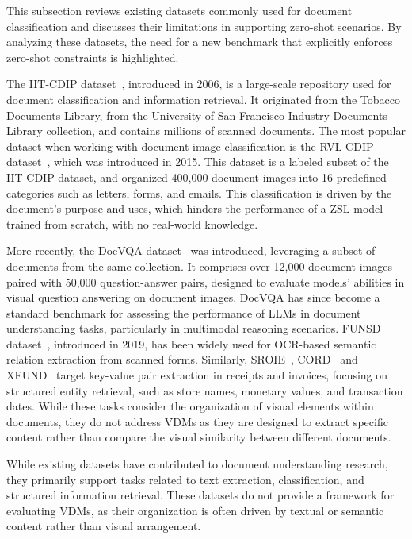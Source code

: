 This subsection reviews existing datasets commonly used for document classification and discusses their limitations in supporting zero-shot scenarios. By analyzing these datasets, the need for a new benchmark that explicitly enforces zero-shot constraints is highlighted.

The IIT-CDIP dataset~\cite{iitcdip2006}, introduced in 2006, is a large-scale repository used for document classification and information retrieval. It originated from the Tobacco Documents Library, from the University of San Francisco Industry Documents Library collection, and contains millions of scanned documents. The most popular dataset when working with document-image classification is the RVL-CDIP dataset~\cite{harley2015rvlcdip}, which was introduced in 2015. This dataset is a labeled subset of the IIT-CDIP dataset, and organized 400,000 document images into 16 predefined categories such as letters, forms, and emails. This classification is driven by the document's purpose and uses, which hinders the performance of a ZSL model trained from scratch, with no real-world knowledge.

More recently, the DocVQA dataset~\cite{mathew2021docvqa} was introduced, leveraging a subset of documents from the same collection. It comprises over 12,000 document images paired with 50,000 question-answer pairs, designed to evaluate models’ abilities in visual question answering on document images. DocVQA has since become a standard benchmark for assessing the performance of \glspl{LLM} in document understanding tasks, particularly in multimodal reasoning scenarios. FUNSD dataset~\cite{funsd2019}, introduced in 2019, has been widely used for OCR-based semantic relation extraction from scanned forms. Similarly, SROIE~\cite{huang_icdar2019}, CORD~\cite{cord2019} and XFUND~\cite{xfund2021} target key-value pair extraction in receipts and invoices, focusing on structured entity retrieval, such as store names, monetary values, and transaction dates. While these tasks consider the organization of visual elements within documents, they do not address \glspl{VDM} as they are designed to extract specific content rather than compare the visual similarity between different documents.

While existing datasets have contributed to document understanding research, they primarily support tasks related to text extraction, classification, and structured information retrieval. These datasets do not provide a framework for evaluating \glspl{VDM}, as their organization is often driven by textual or semantic content rather than visual arrangement.

